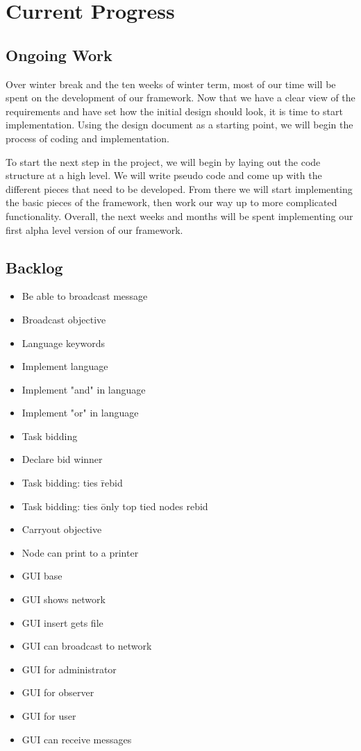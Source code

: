 \documentclass[draftclsnofoot, onecolumn, compsoc, 10pt]{IEEEtran}
\begin{document}
\section{Current Progress}
\subsection{Ongoing Work}
Over winter break and the ten weeks of winter term, most of our time will be spent on the development of our framework. Now that we have a clear view of the requirements and have set how the initial design should look, it is time to start implementation. Using the design document as a starting point, we will begin the process of coding and implementation. 

To start the next step in the project, we will begin by laying out the code structure at a high level. We will write pseudo code and come up with the different pieces that need to be developed. From there we will start implementing the basic pieces of the framework, then work our way up to more complicated functionality. Overall, the next weeks and months will be spent implementing our first alpha level version of our framework.

\subsection{Backlog}
\begin{itemize}
\item Be able to broadcast message
\item Broadcast objective
\item Language keywords
\item Implement language
\item Implement "and" in language
\item Implement "or" in language
\item Task bidding
\item Declare bid winner
\item Task bidding: ties \= rebid
\item Task bidding: ties \= only top tied nodes rebid
\item Carryout objective
\item Node can print to a printer
\item GUI base
\item GUI shows network
\item GUI insert gets file
\item GUI can broadcast to network
\item GUI for administrator
\item GUI for observer
\item GUI for user
\item GUI can receive messages
\end {itemize}
\end{document}
